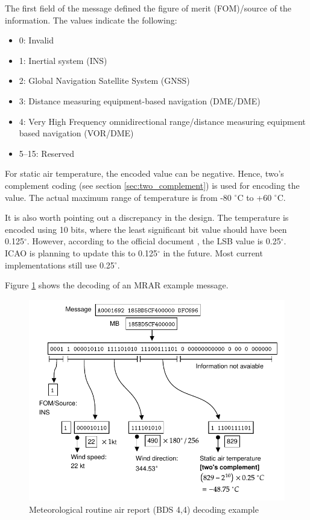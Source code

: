 The first field of the message defined the figure of merit (FOM)/source of the information. The values indicate the following:
\begin{itemize}
    \item 0: Invalid
    \item 1: Inertial system (INS)
    \item 2: Global Navigation Satellite System (GNSS)
    \item 3: Distance measuring equipment-based navigation (DME/DME)
    \item 4: Very High Frequency omnidirectional range/distance measuring equipment based navigation (VOR/DME)
    \item 5--15: Reserved
\end{itemize}

For static air temperature, the encoded value can be negative. Hence, two's complement coding (see section \ref{sec:two_complement}) is used for encoding the value. The actual maximum range of temperature is from -80 $^\circ$C to +60 $^\circ$C.

It is also worth pointing out a discrepancy in the design. The temperature is encoded using 10 bits, where the least significant bit value should have been 0.125$^\circ$. However, according to the official document \cite{icao9871v1}, the LSB value is 0.25$^\circ$. ICAO is planning to update this to 0.125$^\circ$ in the future. Most current implementations still use 0.25$^\circ$. 

Figure \ref{fig:bds44_example} shows the decoding of an MRAR example message.

\begin{figure}[ht]
    \centering
    \includegraphics[scale=0.9]{figures/mode_s/bds44_example.pdf}
    \caption{Meteorological routine air report (BDS 4,4) decoding example}
    \label{fig:bds44_example}
  \end{figure}
  
